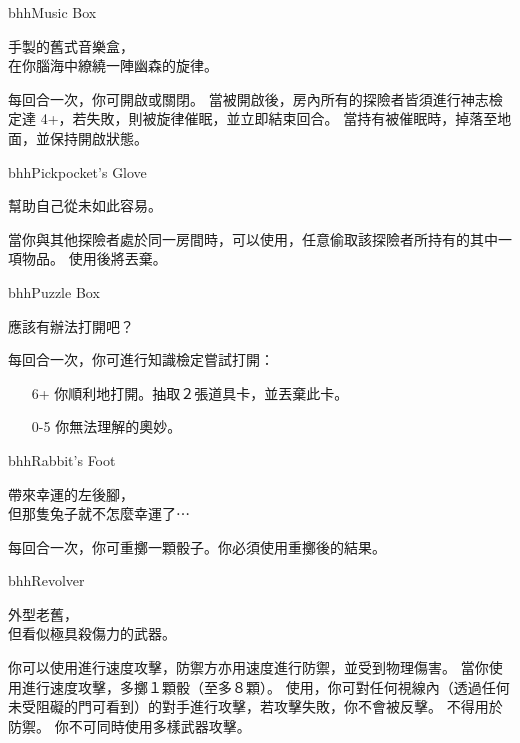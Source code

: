 %
\begin{ItemCard}{bhh}{Music Box}
  \begin{CardStory}
    手製的舊式音樂盒，\\
    在你腦海中繚繞一陣幽森的旋律。
  \end{CardStory}
  每回合一次，你可開啟或關閉\ThisName{}。\smallskip
  當\ThisName{}被開啟後，房內所有的探險者皆須進行神志檢定達 4+，若失敗，則被旋律催眠，並立即結束回合。\smallskip
  當持有\ThisName{}被催眠時，\ThisName{}掉落至地面，並保持開啟狀態。\smallskip
\end{ItemCard}%
%
\begin{ItemCard}{bhh}{Pickpocket’s Glove}
  \begin{CardStory}
    幫助自己從未如此容易。
  \end{CardStory}
  當你與其他探險者處於同一房間時，可以使用\ThisName{}，任意偷取該探險者所持有的其中一項物品。\smallskip
  使用後將\ThisName{}丟棄。\smallskip
\end{ItemCard}%
%
\begin{ItemCard}{bhh}{Puzzle Box}
  \begin{CardStory}
    應該有辦法打開吧？
  \end{CardStory}
  每回合一次，你可進行知識檢定嘗試打開\ThisName{}：
  \begin{itemize}
    \item[6+] 你順利地打開\ThisName{}。抽取２張道具卡，並丟棄此卡。
    \item[0-5] 你無法理解\ThisName{}的奧妙。
  \end{itemize}
\end{ItemCard}%
%
\begin{ItemCard}{bhh}{Rabbit’s Foot}
  \begin{CardStory}
    帶來幸運的左後腳，\\
    但那隻兔子就不怎麼幸運了⋯
  \end{CardStory}
  每回合一次，你可重擲一顆骰子。你必須使用重擲後的結果。\smallskip
\end{ItemCard}%
%
\begin{ItemCard}{bhh}{Revolver}%
  \begin{CardStory}
    外型老舊，\\
    但看似極具殺傷力的武器。
  \end{CardStory}
  你可以使用\ThisName{}進行速度攻擊，防禦方亦用速度進行防禦，並受到物理傷害。\smallskip
  當你使用\ThisName{}進行速度攻擊，多擲１顆骰（至多８顆）。\smallskip
  使用\ThisName{}，你可對任何視線內（透過任何未受阻礙的門可看到）的對手進行攻擊，若攻擊失敗，你不會被反擊。\smallskip
  \ThisName{}不得用於防禦。\smallskip
  你不可同時使用多樣武器攻擊。\smallskip
\end{ItemCard}%
